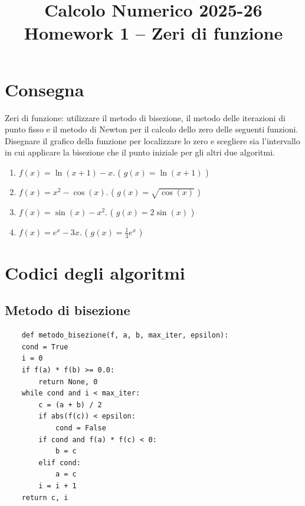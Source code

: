 \documentclass[11pt,a4paper]{article}
\title{\vspace{-1cm}Calcolo Numerico 2025-26\\[6pt]
\large \textbf{Homework 1 -- Zeri di funzione}}
\author{}
\date{}
\begin{document}
\maketitle
\section*{Consegna}
\noindent Zeri di funzione: utilizzare il metodo di bisezione, il metodo delle iterazioni di punto fisso e il metodo di Newton per il calcolo dello zero delle seguenti funzioni. Disegnare il grafico della funzione per localizzare lo zero e scegliere sia l'intervallo in cui applicare la bisezione che il punto iniziale per gli altri due algoritmi.

\bigskip

\begin{enumerate}[left=0pt,label=\textbf{\arabic*.}]
  \item \(f(x)=\ln(x+1)-x\). \quad ( \(g(x)=\ln(x+1)\) )
  \medskip

  \item \(f(x)=x^{2}-\cos(x)\). \quad ( \(g(x)=\sqrt{\cos(x)}\) )
  \medskip

  \item \(f(x)=\sin(x)-x^{2}\). \quad ( \(g(x)=2\sin(x)\) )
  \medskip

  \item \(f(x)=e^{x}-3x\). \quad ( \(g(x)=\tfrac{1}{3}e^{x}\) )
  \medskip
\end{enumerate}

\bigskip

\section*{Codici degli algoritmi}
\subsection*{Metodo di bisezione}

\begin{verbatim}
    def metodo_bisezione(f, a, b, max_iter, epsilon):
    cond = True
    i = 0
    if f(a) * f(b) >= 0.0:
        return None, 0
    while cond and i < max_iter:
        c = (a + b) / 2
        if abs(f(c)) < epsilon:
            cond = False
        if cond and f(a) * f(c) < 0:
            b = c
        elif cond:
            a = c
        i = i + 1 
    return c, i
\end{verbatim}
\end{document}
